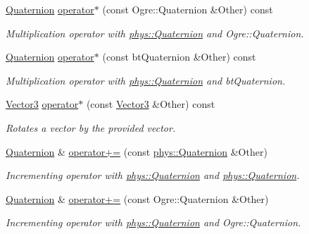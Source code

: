 \begin{DoxyCompactItemize}
\hyperlink{classphys_1_1Quaternion}{Quaternion} \hyperlink{classphys_1_1Quaternion_ae37df9d07e51739908e05a4bd518c1e1}{operator$\ast$} (const Ogre::Quaternion \&Other) const 
\begin{DoxyCompactList}\small\item\em Multiplication operator with \hyperlink{classphys_1_1Quaternion}{phys::Quaternion} and Ogre::Quaternion. \item\end{DoxyCompactList}\item 
\hyperlink{classphys_1_1Quaternion}{Quaternion} \hyperlink{classphys_1_1Quaternion_abafe5f21ebfac271310905b29da13373}{operator$\ast$} (const btQuaternion \&Other) const 
\begin{DoxyCompactList}\small\item\em Multiplication operator with \hyperlink{classphys_1_1Quaternion}{phys::Quaternion} and btQuaternion. \item\end{DoxyCompactList}\item 
\hyperlink{classphys_1_1Vector3}{Vector3} \hyperlink{classphys_1_1Quaternion_a4e3107c95f94d2b4ddae8c86be9fe28e}{operator$\ast$} (const \hyperlink{classphys_1_1Vector3}{Vector3} \&Other) const 
\begin{DoxyCompactList}\small\item\em Rotates a vector by the provided vector. \item\end{DoxyCompactList}\item 
\hyperlink{classphys_1_1Quaternion}{Quaternion} \& \hyperlink{classphys_1_1Quaternion_a5d9d2ee516e4e142417b21eecf2e94ce}{operator+=} (const \hyperlink{classphys_1_1Quaternion}{phys::Quaternion} \&Other)
\begin{DoxyCompactList}\small\item\em Incrementing operator with \hyperlink{classphys_1_1Quaternion}{phys::Quaternion} and \hyperlink{classphys_1_1Quaternion}{phys::Quaternion}. \item\end{DoxyCompactList}\item 
\hyperlink{classphys_1_1Quaternion}{Quaternion} \& \hyperlink{classphys_1_1Quaternion_ada6772fd05ec9c8d50b8a25ece3d1c5b}{operator+=} (const Ogre::Quaternion \&Other)
\begin{DoxyCompactList}\small\item\em Incrementing operator with \hyperlink{classphys_1_1Quaternion}{phys::Quaternion} and Ogre::Quaternion. \item\end{DoxyCompactList}\item 

\end{DoxyCompactItemize}
